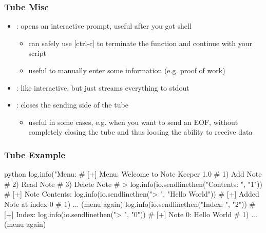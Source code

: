 \documentclass[aspectratio=169]{beamer}
\begin{document}
{\begin{frame}[fragile]
    \frametitle{Tube Misc}
    \begin{itemize}
        \item {}: opens an interactive prompt, useful after you got shell
        \begin{itemize}
            \item can safely use [ctrl-c] to terminate the function and continue with your script
            \item useful to manually enter some information (e.g. proof of work)
        \end{itemize}
        \item {}: like interactive, but just streams everything to stdout
        \item {}: closes the sending side of the tube
        \begin{itemize}
            \item useful in some cases, e.g. when you want to send an EOF, without completely closing the tube and thus loosing the ability to receive data
        \end{itemize}
    \end{itemize}
\end{frame}

\begin{frame}[fragile]
    \frametitle{Tube Example}
    \begin{codebox}{python}
log.info("Menu: %
# [+] Menu: Welcome to Note Keeper 1.0
# 1) Add Note
# 2) Read Note
# 3) Delete Note
# > 
log.info(io.sendlinethen("Contents: ", "1"))
# [+] Note Contents: 
log.info(io.sendlinethen("> ", "Hello World"))
# [+] Added Note at index 0
# 1) ... (menu again)
log.info(io.sendlinethen("Index: ", "2"))
# [+] Index: 
log.info(io.sendlinethen("> ", "0"))
# [+] Note 0: Hello World
# 1) ... (menu again)\end{codebox}
\end{frame}

}
\end{document}

